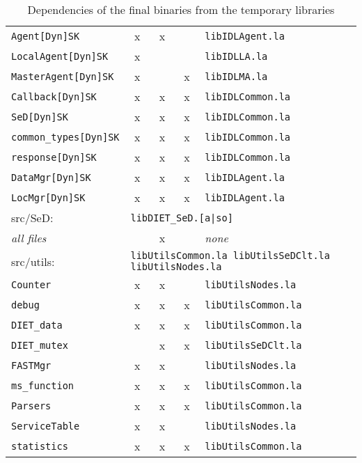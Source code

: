 \begin{table}[h]
\begin{tabular}[c]{|l|c|c|c|l|}
  \texttt{Agent[Dyn]SK}           & x & x &   & \texttt{libIDLAgent.la}\\
  \texttt{LocalAgent[Dyn]SK}      & x &   &   & \texttt{libIDLLA.la}\\
  \texttt{MasterAgent[Dyn]SK}     & x &   & x & \texttt{libIDLMA.la}\\
  \texttt{Callback[Dyn]SK}        & x & x & x & \texttt{libIDLCommon.la}\\
  \texttt{SeD[Dyn]SK}             & x & x & x & \texttt{libIDLCommon.la}\\
  \texttt{common\_types[Dyn]SK}   & x & x & x & \texttt{libIDLCommon.la}\\
  \texttt{response[Dyn]SK}        & x & x & x & \texttt{libIDLCommon.la}\\
  \texttt{DataMgr[Dyn]SK}        & x & x & x & \texttt{libIDLAgent.la}\\
  \texttt{LocMgr[Dyn]SK}        & x & x & x & \texttt{libIDLAgent.la}\\[5pt]
  \hline


  \multicolumn{1}{|l}{\textsf{src/SeD}:} &
  \multicolumn{4}{l|}{\texttt{libDIET\_SeD.[a|so]}}\\[5pt]

  \textit{all files}              &   & x &   & \emph{none}\\[5pt]
  \hline


  \multicolumn{1}{|l}{\textsf{src/utils}:} &
  \multicolumn{4}{l|}{\texttt{libUtilsCommon.la 
                             libUtilsSeDClt.la  libUtilsNodes.la}}\\[5pt]

  \texttt{Counter}                & x & x &   & \texttt{libUtilsNodes.la}\\
  \texttt{debug}                  & x & x & x & \texttt{libUtilsCommon.la}\\
  \texttt{DIET\_data}             & x & x & x & \texttt{libUtilsCommon.la}\\
  \texttt{DIET\_mutex}            &   & x & x & \texttt{libUtilsSeDClt.la}\\
  \texttt{FASTMgr}                & x & x &   & \texttt{libUtilsNodes.la}\\
  \texttt{ms\_function}           & x & x & x & \texttt{libUtilsCommon.la}\\
  \texttt{Parsers}                & x & x & x & \texttt{libUtilsCommon.la}\\
  \texttt{ServiceTable}           & x & x &   & \texttt{libUtilsNodes.la}\\
  \texttt{statistics}             & x & x & x & \texttt{libUtilsCommon.la}\\[5pt]
  \hline
 

 \end{tabular}
 \caption{Dependencies of the final binaries from the temporary
 libraries}
 \label{t:dep}
\end{table}


